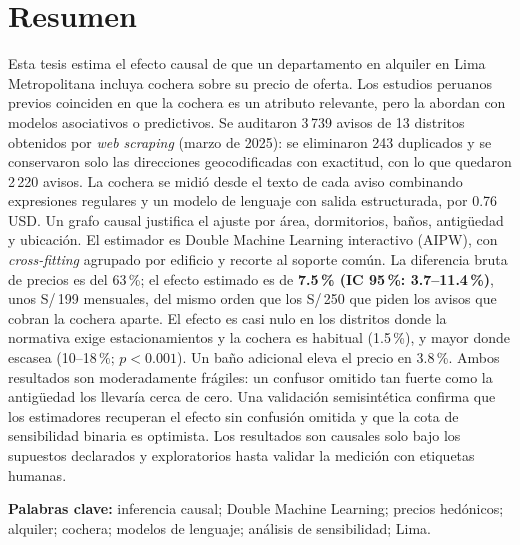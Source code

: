 \documentclass[12pt,a4paper,oneside]{report}
\begin{document}
\chapter*{Resumen}
Esta tesis estima el efecto causal de que un departamento en alquiler en Lima Metropolitana incluya cochera sobre su precio de oferta. Los estudios peruanos previos coinciden en que la cochera es un atributo relevante, pero la abordan con modelos asociativos o predictivos. Se auditaron 3\,739 avisos de 13 distritos obtenidos por \textit{web scraping} (marzo de 2025): se eliminaron 243 duplicados y se conservaron solo las direcciones geocodificadas con exactitud, con lo que quedaron 2\,220 avisos. La cochera se midió desde el texto de cada aviso combinando expresiones regulares y un modelo de lenguaje con salida estructurada, por 0.76 USD. Un grafo causal justifica el ajuste por área, dormitorios, baños, antigüedad y ubicación. El estimador es Double Machine Learning interactivo (AIPW), con \textit{cross-fitting} agrupado por edificio y recorte al soporte común. La diferencia bruta de precios es del 63\,\%; el efecto estimado es de \textbf{7.5\,\% (IC 95\,\%: 3.7--11.4\,\%)}, unos S/\,199 mensuales, del mismo orden que los S/\,250 que piden los avisos que cobran la cochera aparte. El efecto es casi nulo en los distritos donde la normativa exige estacionamientos y la cochera es habitual (1.5\,\%), y mayor donde escasea (10--18\,\%; $p<0.001$). Un baño adicional eleva el precio en 3.8\,\%. Ambos resultados son moderadamente frágiles: un confusor omitido tan fuerte como la antigüedad los llevaría cerca de cero. Una validación semisintética confirma que los estimadores recuperan el efecto sin confusión omitida y que la cota de sensibilidad binaria es optimista. Los resultados son causales solo bajo los supuestos declarados y exploratorios hasta validar la medición con etiquetas humanas.

\noindent\textbf{Palabras clave:} inferencia causal; Double Machine Learning; precios hedónicos; alquiler; cochera; modelos de lenguaje; análisis de sensibilidad; Lima.
\end{document}
